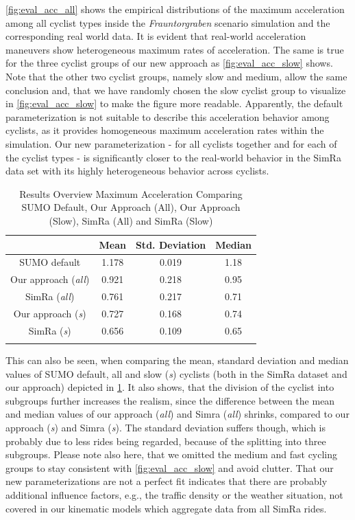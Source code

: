 \cref{fig:eval_acc_all} shows the empirical distributions of the maximum acceleration among all cyclist types inside the \textit{Frauntorgraben} scenario simulation and the corresponding real world data.
It is evident that real-world acceleration maneuvers show heterogeneous maximum rates of acceleration.
The same is true for the three cyclist groups of our new approach as \cref{fig:eval_acc_slow} shows.
Note that the other two cyclist groups, namely slow and medium, allow the same conclusion and, that we have randomly chosen the slow cyclist group to visualize in \cref{fig:eval_acc_slow} to make the figure more readable.
Apparently, the default parameterization is not suitable to describe this acceleration behavior among cyclists, as it provides homogeneous maximum acceleration rates within the simulation.
Our new parameterization - for all cyclists together and for each of the cyclist types - is significantly closer to the real-world behavior in the SimRa data set with its highly heterogeneous behavior across cyclists.
\begin{table}
\centering
\caption{Results Overview Maximum Acceleration Comparing SUMO Default, Our Approach (All), Our Approach (Slow), SimRa (All) and SimRa (Slow)}%
\label{tab:results_overview_acc}
\begin{tabular}{cccc}
\toprule
& Mean & Std. Deviation & Median\\
\midrule
\midrule
SUMO default & \num{1.178} & \num{0.019} & \num{1.18} \\
\midrule
Our approach (\textit{all}) & \num{0.921} & \num{0.218} & \num{0.95} \\
SimRa (\textit{all}) & \num{0.761} & \num{0.217} & \num{0.71} \\
\midrule
Our approach (\textit{s}) & \num{0.727} & \num{0.168} & \num{0.74} \\
SimRa (\textit{s}) & \num{0.656} & \num{0.109} & \num{0.65} \\
\bottomrule&
\end{tabular}
\end{table}
This can also be seen, when comparing the mean, standard deviation and median values of SUMO default, all and slow (\textit{s}) cyclists (both in the SimRa dataset and our approach) depicted in \cref{tab:results_overview_acc}.
It also shows, that the division of the cyclist into subgroups further increases the realism, since the difference between the mean and median values of our approach (\textit{all}) and Simra (\textit{all}) shrinks, compared to our approach (\textit{s}) and Simra (\textit{s}).
The standard deviation suffers though, which is probably due to less rides being regarded, because of the splitting into three subgroups.
Please note also here, that we omitted the medium and fast cycling groups to stay consistent with \cref{fig:eval_acc_slow} and avoid clutter.
That our new parameterizations are not a perfect fit indicates that there are probably additional influence factors, e.g., the traffic density or the weather situation, not covered in our kinematic models which aggregate data from all SimRa rides.

